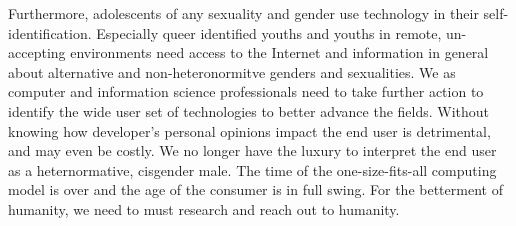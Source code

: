 \documentclass{acmsmall}
\begin{document}
Furthermore, adolescents of any sexuality and gender use technology in their self-identification. Especially queer identified youths and youths in remote, un-accepting environments need access to the Internet and information in general about alternative and non-heteronormitve genders and sexualities. We as computer and information science professionals need to take further action to identify the wide user set of technologies to better advance the fields. Without knowing how developer's personal opinions impact the end user is detrimental, and may even be costly. We no longer have the luxury to interpret the end user as a heternormative, cisgender male. The time of the one-size-fits-all computing model is over and the age of the consumer is in full swing. For the betterment of humanity, we need to must research and reach out to humanity.



\end{document}
